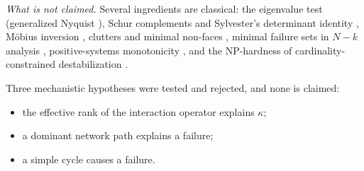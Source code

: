 \documentclass[journal]{IEEEtran}
\theoremstyle{definition}
\theoremstyle{remark}
\begin{document}
\emph{What is not claimed.} Several ingredients are classical: the eigenvalue
test (generalized Nyquist \cite{macfarlane1970return, macfarlane1977gnc}),
Schur complements and Sylvester's determinant identity \cite{horn2012matrix},
M\"obius inversion \cite{rota1964mobius}, clutters and minimal non-faces
\cite{stanley1996combinatorics}, minimal failure sets in $N\!-\!k$ analysis
\cite{bienstock2010nk}, positive-systems monotonicity
\cite{farina2000positive}, and the NP-hardness of cardinality-constrained
destabilization \cite{magdon2017sparsepca}.

Three mechanistic hypotheses were tested and rejected, and none is claimed:
\begin{itemize}
\item the effective rank of the interaction operator explains $\kappa$;
\item a dominant network path explains a failure;
\item a simple cycle causes a failure.
\end{itemize}
\end{document}
